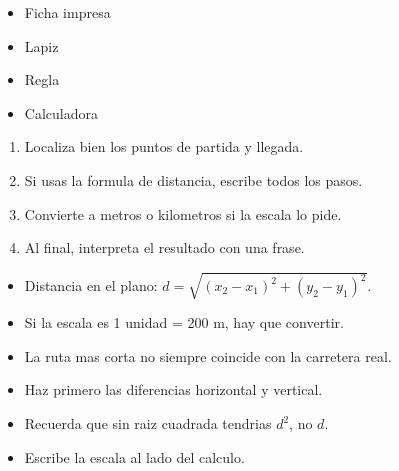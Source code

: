\documentclass[12pt,a4paper]{article}
\begin{document}
        \FichaCabecera

        \begin{materialesbox}
        \begin{itemize}
    \item Ficha impresa
    \item Lapiz
    \item Regla
    \item Calculadora
\end{itemize}
        \end{materialesbox}

        \begin{pasosbox}
        \begin{enumerate}
    \item Localiza bien los puntos de partida y llegada.
    \item Si usas la formula de distancia, escribe todos los pasos.
    \item Convierte a metros o kilometros si la escala lo pide.
    \item Al final, interpreta el resultado con una frase.
\end{enumerate}
        \end{pasosbox}

        \begin{recordatoriobox}
        \begin{itemize}
    \item Distancia en el plano: $d=\sqrt{(x_2-x_1)^2+(y_2-y_1)^2}$.
    \item Si la escala es 1 unidad = 200 m, hay que convertir.
    \item La ruta mas corta no siempre coincide con la carretera real.
\end{itemize}
        \end{recordatoriobox}

        \begin{apoyobox}
        \begin{itemize}
    \item Haz primero las diferencias horizontal y vertical.
    \item Recuerda que sin raiz cuadrada tendrias $d^2$, no $d$.
    \item Escribe la escala al lado del calculo.
\end{itemize}
        \end{apoyobox}


\end{document}
